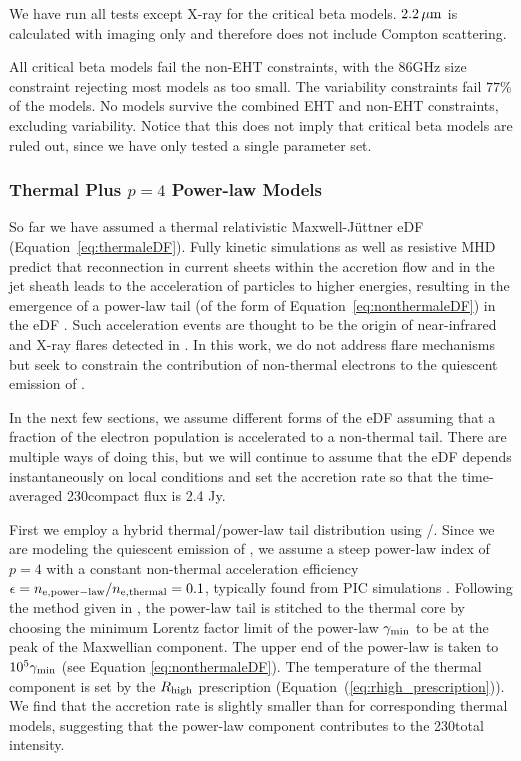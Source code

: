 We have run all tests except X-ray for the critical beta models. $2.2\,\mu\mathrm{m}$ is calculated with imaging only and therefore does not include Compton scattering.  


All critical beta models fail the non-EHT constraints, with the 86GHz size constraint rejecting most models as too small.  The variability constraints fail $77\%$ of the models.  No models survive the combined EHT and non-EHT constraints, excluding variability.  Notice that this does not imply that critical beta models are ruled out, since we have only tested a single parameter set.

\subsubsection{Thermal Plus \texorpdfstring{$p = 4$}{p=4} Power-law Models}

So far we have assumed a thermal relativistic Maxwell-J{\"u}ttner eDF (Equation~\ref{eq:thermaleDF}). Fully kinetic simulations as well as resistive MHD predict that reconnection in current sheets within the accretion flow and in the jet sheath leads to the acceleration of particles to higher energies, resulting in the emergence of a power-law tail (of the form of Equation~\ref{eq:nonthermaleDF}) in the eDF \citep[e.g.,][and references therein]{Sironi2021}. Such acceleration events are thought to be the origin of near-infrared and X-ray flares detected in \sgra. In this work, we do not address flare mechanisms but seek to constrain the contribution of non-thermal electrons to the quiescent emission of \sgra. 

In the next few sections, we assume different forms of the eDF assuming that a fraction of the electron population is accelerated to a non-thermal tail. There are multiple ways of doing this, but we will continue to assume that the eDF depends instantaneously on local conditions and set the accretion rate so that the time-averaged 230\GHz compact flux is 2.4 Jy.

First we employ a hybrid thermal/power-law tail distribution using \hamr/\bhoss. Since we are modeling the quiescent emission of \sgra, we assume a steep power-law index of $p=4$ with a constant non-thermal acceleration efficiency $\epsilon=n_{\rm e, power-law}/n_{\rm e, thermal}=0.1$, typically found from PIC simulations \citep[e.g.,][]{Sironi2015,Crumley2019}. Following the method given in \citet{Chatterjee2021}, the power-law tail is stitched to the thermal core by choosing the minimum Lorentz factor limit of the power-law $\gamma_{\rm min}$ to be at the peak of the Maxwellian component. The upper end of the power-law is taken to $10^5 \gamma_{\rm min}$ (see Equation \ref{eq:nonthermaleDF}).  The temperature of the thermal component is set by the $R_\mathrm{high}$ prescription (Equation~(\ref{eq:rhigh_prescription})). We find that the accretion rate is slightly smaller than for corresponding thermal models, suggesting that the power-law component contributes to the 230\GHz total intensity. 

